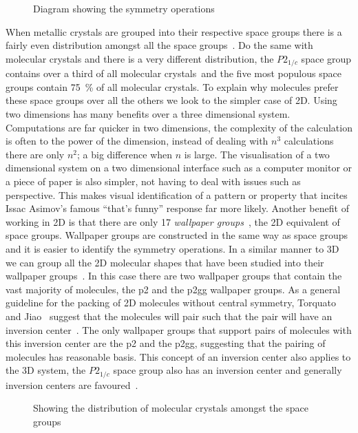 \begin{figure}
    \caption{Diagram showing the symmetry operations}
    \label{fig:symmetry ops}
\end{figure}

When metallic crystals are grouped into their respective space groups there is a fairly even distribution amongst all the space groups~. Do the same with molecular crystals and there is a very different distribution, the $P2_{1/c}$ space group contains over a third of all molecular crystals~\tocite and the five most populous space groups contain \SI{75}{\percent} of all molecular crystals. To explain why molecules prefer these space groups over all the others we look to the simpler case of 2D. Using two dimensions has many benefits over a three dimensional system. Computations are far quicker in two dimensions, the complexity of the calculation is often to the power of the dimension, instead of dealing with $n^3$ calculations there are only $n^2$; a big difference when $n$ is large. The visualisation of a two dimensional system on a two dimensional interface such as a computer monitor or a piece of paper is also simpler, not having to deal with issues such as perspective. This makes visual identification of a pattern or property that incites Issac Asimov's famous ``that's funny'' response far more likely. Another benefit of working in 2D is that there are only 17 \emph{wallpaper groups}~, the 2D equivalent of space groups. Wallpaper groups are constructed in the same way as space groups and it is easier to identify the symmetry operations. In a similar manner to 3D we can group all the 2D molecular shapes that have been studied into their wallpaper groups~. In this case there are two wallpaper groups that contain the vast majority of molecules, the p2 and the p2gg wallpaper groups. As a general guideline for the packing of 2D molecules without central symmetry, Torquato and Jiao~\cite{torquato:12} suggest that the molecules will pair such that the pair will have an inversion center~. The only wallpaper groups that support pairs of molecules with this inversion center are the p2 and the p2gg, suggesting that the pairing of molecules has reasonable basis. This concept of an inversion center also applies to the 3D system, the $P2_{1/c}$ space group also has an inversion center and generally inversion centers are favoured~\cite{brock:94}.

\begin{figure}
    \caption{Showing the distribution of molecular crystals amongst the space groups}
    \label{fig:space dist}
\end{figure}

